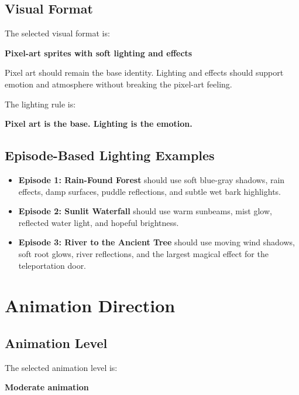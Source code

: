 \documentclass[12pt]{article}
\begin{document}
\subsection{Visual Format}

The selected visual format is:

\begin{center}
\textbf{Pixel-art sprites with soft lighting and effects}
\end{center}

Pixel art should remain the base identity. Lighting and effects should support emotion and atmosphere without breaking the pixel-art feeling.

The lighting rule is:

\begin{center}
\textbf{Pixel art is the base. Lighting is the emotion.}
\end{center}

\subsection{Episode-Based Lighting Examples}

\begin{itemize}[leftmargin=*]
    \item \textbf{Episode 1: Rain-Found Forest} should use soft blue-gray shadows, rain effects, damp surfaces, puddle reflections, and subtle wet bark highlights.
    \item \textbf{Episode 2: Sunlit Waterfall} should use warm sunbeams, mist glow, reflected water light, and hopeful brightness.
    \item \textbf{Episode 3: River to the Ancient Tree} should use moving wind shadows, soft root glows, river reflections, and the largest magical effect for the teleportation door.
\end{itemize}

\section{Animation Direction}

\subsection{Animation Level}

The selected animation level is:

\begin{center}
\textbf{Moderate animation}
\end{center}
\end{document}
